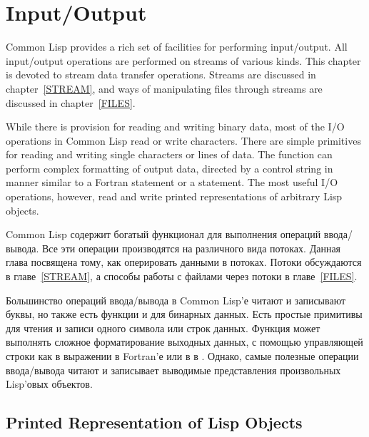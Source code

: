 
\clearpage\def\pagestatus{FINAL PROOF}

\chapter{Input/Output}
\label{IO}


Common Lisp provides a rich set of facilities for performing input/output.
All input/output operations are performed on streams of various kinds.
This chapter is devoted to stream data transfer operations.
Streams are discussed in chapter~\ref{STREAM}, and
ways of manipulating files through streams are discussed in
chapter~\ref{FILES}.

While there is provision for reading and writing binary data,
most of the I/O operations in Common Lisp read or write characters.
There are simple primitives for reading and writing single characters
or lines of data.  The  function can perform complex
formatting of output data, directed by a control string
in manner similar to a Fortran  statement
or a   statement.  The most useful I/O operations,
however, read and write printed representations of arbitrary
Lisp objects.

Common Lisp содержит богатый функционал для выполнения операций ввода/вывода.
Все эти операции производятся на различного вида потоках.
Данная глава посвящена тому, как оперировать данными в потоках.
Потоки обсуждаются в главе~\ref{STREAM}, а способы работы с файлами
через потоки в главе~\ref{FILES}.

Большинство операций ввода/вывода в Common Lisp'е читают и записывают
буквы, но также есть функции и для бинарных данных.  Есть
простые примитивы для чтения и записи одного символа или строк
данных. Функция  может выполнять сложное форматирование
выходных данных, с помощью управляющей строки как в выражении
 в Fortran'е или в  в .  Однако,
самые полезные операции ввода/вывода читают и записывает выводимые
представления произвольных Lisp'овых объектов.

\section{Printed Representation of Lisp Objects}

